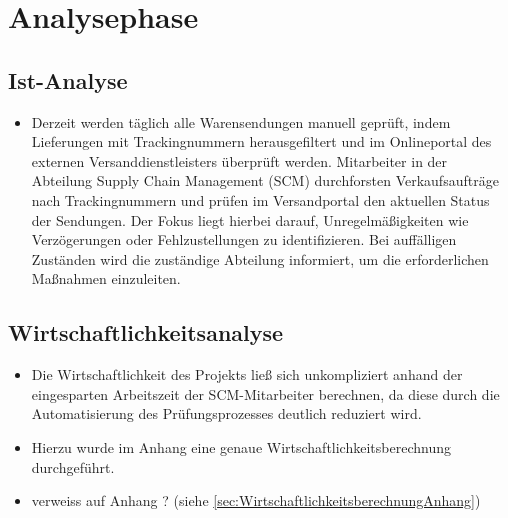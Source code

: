 \section{Analysephase} 
\label{sec:Analysephase}


\subsection{Ist-Analyse} 
\label{sec:IstAnalyse}
\begin{itemize}
	\item Derzeit werden täglich alle Warensendungen manuell geprüft, indem Lieferungen mit Trackingnummern herausgefiltert und im Onlineportal des externen Versanddienstleisters überprüft werden. Mitarbeiter in der Abteilung Supply Chain Management (SCM) durchforsten Verkaufsaufträge nach Trackingnummern und prüfen im Versandportal den aktuellen Status der Sendungen. Der Fokus liegt hierbei darauf, Unregelmäßigkeiten wie Verzögerungen oder Fehlzustellungen zu identifizieren. Bei auffälligen Zuständen wird die zuständige Abteilung informiert, um die erforderlichen Maßnahmen einzuleiten. 
	
\end{itemize}

\subsection{Wirtschaftlichkeitsanalyse}
\label{sec:Wirtschaftlichkeitsanalyse}
\begin{itemize}
	\item Die Wirtschaftlichkeit des Projekts ließ sich unkompliziert anhand der eingesparten Arbeitszeit der SCM-Mitarbeiter berechnen, da diese durch die Automatisierung des Prüfungsprozesses deutlich reduziert wird.
	\item Hierzu wurde im Anhang eine genaue Wirtschaftlichkeitsberechnung durchgeführt.
	\item verweiss auf Anhang ?  (siehe \ref{sec:WirtschaftlichkeitsberechnungAnhang})
\end{itemize}



